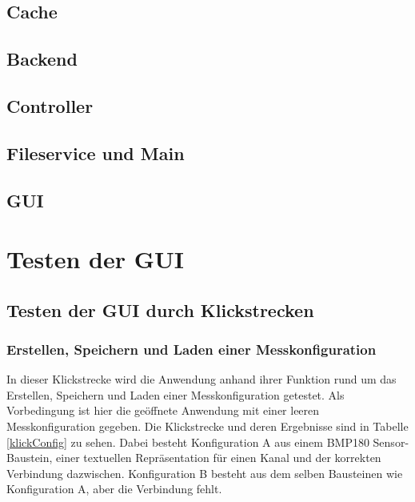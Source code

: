 \documentclass[parskip=full]{scrartcl}
\begin{document}
\subsection{Cache}
\subsection{Backend}
\subsection{Controller}
\subsection{Fileservice und Main}
\subsection{GUI}

\clearpage
\section{Testen der GUI} \label{gui}


\subsection{Testen der GUI durch Klickstrecken}

\subsubsection{Erstellen, Speichern und Laden einer Messkonfiguration}

In dieser Klickstrecke wird die Anwendung anhand ihrer Funktion rund um das Erstellen, Speichern und Laden einer Messkonfiguration getestet. Als Vorbedingung ist hier die geöffnete Anwendung mit einer leeren Messkonfiguration gegeben. Die Klickstrecke und deren Ergebnisse sind in Tabelle \ref{klickConfig} zu sehen. Dabei besteht Konfiguration A aus einem BMP180 Sensor-Baustein, einer textuellen Repräsentation für einen Kanal und der korrekten Verbindung dazwischen. Konfiguration B besteht aus dem selben Bausteinen wie Konfiguration A, aber die Verbindung fehlt.  
\end{document}
